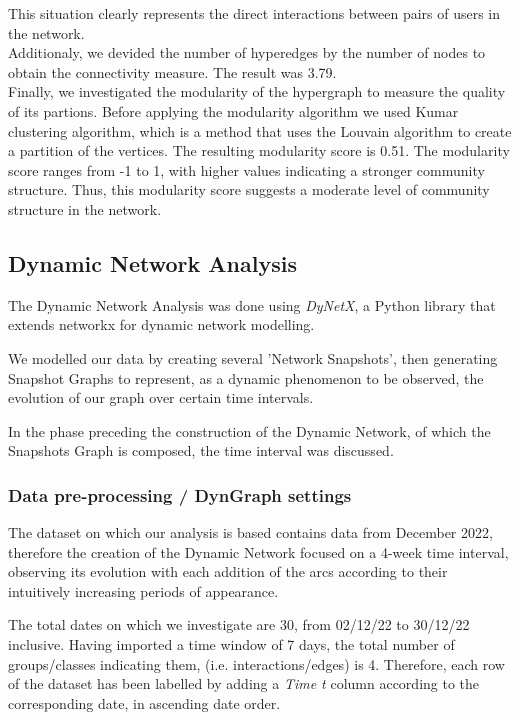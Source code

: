 \documentclass[sigchi]{acmart}
\begin{document}
This situation clearly represents the direct interactions between pairs of users in the network.  \\
Additionaly, we devided the number of hyperedges by the number of nodes to obtain the connectivity measure. The result was 3.79. \\
Finally, we investigated the modularity of the hypergraph to measure the quality of its partions. 
Before applying the modularity algorithm we used Kumar clustering algorithm, which is a method that uses the Louvain algorithm to create a partition of the vertices. The resulting modularity score is 0.51. The modularity score ranges from -1 to 1, with higher values indicating a stronger community structure. Thus, this modularity score suggests a moderate level of community structure in the network.



\subsection{Dynamic Network Analysis}
The Dynamic Network Analysis was done using \textit{DyNetX}\cite{DynetX}, a Python library that extends networkx for dynamic network modelling. 

\noindent We modelled our data by creating several 'Network Snapshots', then generating Snapshot Graphs to represent, as a dynamic phenomenon to be observed, the evolution of our graph over certain time intervals.

\noindent In the phase preceding the construction of the Dynamic Network, of which the Snapshots Graph is composed, the time interval was discussed. 

\subsubsection{Data pre-processing / DynGraph settings} 
The dataset on which our analysis is based contains data from December 2022, 
therefore the creation of the Dynamic Network focused on a 4-week time interval, observing its evolution with each addition of the arcs according to their intuitively increasing periods of appearance. 

The total dates on which we investigate are 30, from 02/12/22 to 30/12/22 inclusive.
Having imported a time window of 7 days, the total number of groups/classes indicating them, (i.e. interactions/edges) is 4. Therefore, each row of the dataset has been labelled by adding a \textit{Time t} column according to the corresponding date, in ascending date order.
\end{document}
